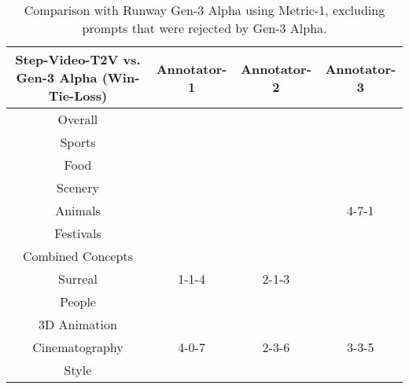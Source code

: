 \begin{table}[ht]\scriptsize
\centering
\begin{tabular}{c|c|c|c}
\hline
Step-Video-T2V vs. Gen-3 Alpha (Win-Tie-Loss) & Annotator-1  & Annotator-2 & Annotator-3 \\
\hline
\hline
Overall & \cellcolor{green!20}{68-3-38} & \cellcolor{green!20}{60-27-25} & \cellcolor{green!20}{54-36-22} \\
\hline
\hline
Sports & \cellcolor{green!20}{10-0-2} & \cellcolor{green!20}{11-1-0} & \cellcolor{green!20}{6-5-1} \\
\hline
Food & \cellcolor{green!20}{10-0-1} & \cellcolor{green!20}{7-2-2} & \cellcolor{green!20}{5-3-3} \\
\hline
Scenery & \cellcolor{green!20}{7-2-3} & \cellcolor{green!20}{7-2-3} & \cellcolor{green!20}{7-1-4} \\
\hline
Animals & \cellcolor{green!20}{7-1-4} & \cellcolor{green!20}{7-3-2} & 4-7-1 \\
\hline
Festivals & \cellcolor{green!20}{7-0-4} & \cellcolor{green!20}{6-5-0} & \cellcolor{green!20}{2-9-0} \\
\hline
Combined Concepts & \cellcolor{green!20}{6-1-5} & \cellcolor{yellow!20}{4-4-4} & \cellcolor{green!20}{9-0-3} \\
\hline
Surreal & 1-1-4 & 2-1-3 & \cellcolor{green!20}{6-0-0} \\
\hline
People & \cellcolor{green!20}{5-1-6} & \cellcolor{green!20}{5-3-4} & \cellcolor{green!20}{7-3-2} \\
\hline
3D Animation & \cellcolor{green!20}{1-0-0} & \cellcolor{green!20}{1-0-0} & \cellcolor{yellow!20}{0-1-0} \\
\hline
Cinematography & 4-0-7 & 2-3-6 & 3-3-5 \\
\hline
Style & \cellcolor{green!20}{10-0-2} & \cellcolor{green!20}{8-3-1} & \cellcolor{green!20}{5-4-3} \\
\hline
\end{tabular}
\caption{Comparison with Runway Gen-3 Alpha using Metric-1, excluding prompts that were rejected by Gen-3 Alpha.} 
\label{ranking-runway1}
\end{table}




